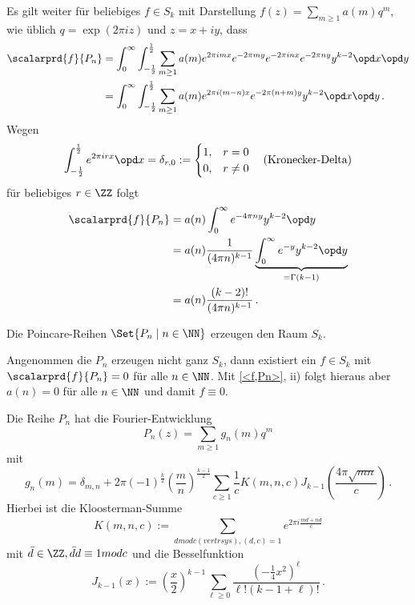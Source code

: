 \begin{bewe-list}
Es gilt weiter für beliebiges $f \in S_k$ mit Darstellung $f(z) = \sum_{m \geq 1} a(m)q^m$, wie üblich $q = \exp(2\pi iz)$ und $z = x + iy$, dass
\begin{align*}
	\scalarprd {f}{P_n} &= \int_0^\infty \int_{-\frac 12}^{\frac 12} \sum_{m \geq 1} a(m) e^{2 \pi imx}e^{-2\pi my}e^{-2\pi inx}e^{-2\pi ny}y^{k-2} \opd x \opd y\\
	&= \int_0^\infty \int_{-\frac 12}^{\frac 12} \sum_{m \geq 1} a(m) e^{2 \pi i(m-n)x}e^{-2\pi (n+m)y}y^{k-2} \opd x \opd y\,.
\end{align*}
Wegen 
\[
	\int_{- \frac 12}^{\frac 12} e^{2 \pi irx} \opd x = \delta_{r,0} := \begin{cases}1, & r = 0\\0, & r \neq 0\end{cases} \quad \text{(Kronecker-Delta)}
\]
für beliebiges $r \in \ZZ$ folgt
\begin{align*}
	\scalarprd {f}{P_n} &= a(n) \int_0^\infty e^{-4\pi ny} y^{k-2} \opd y \\
	&= a(n) \frac{1}{(4\pi n)^{k-1}} \underbrace{\int_0^\infty e^{-y} y^{k-2} \opd y}_{= \Gamma(k-1)} \\
	&= a(n) \frac{(k-2)!}{(4\pi n)^{k-1}}
	\,.
\end{align*}
\end{bewe-list}

\begin{koro}
Die Poincare-Reihen $\Set{ P_n \mid n \in \NN}$ erzeugen den Raum $S_k$.
\end{koro}

\begin{bewe}
Angenommen die $P_n$ erzeugen nicht ganz $S_k$, dann existiert ein $f \in S_k$ mit $\scalarprd {f}{P_n} = 0$ für alle $n \in \NN$. Mit \autoref{<f,Pn>}, ii) folgt hieraus aber $a(n) = 0$ für alle $n \in \NN$ und damit $f \equiv 0$.
\end{bewe}

\begin{satz}
Die Reihe $P_n$ hat die Fourier-Entwicklung
\[
	P_n(z) = \sum_{m \geq 1} g_n(m) q^m
\]
mit
\[
	g_n(m) = \delta_{m,n} + 2\pi (-1)^{\frac k2} (\frac mn)^{\frac {k-1}2} \sum_{c \geq 1} \frac 1c K(m,n,c) J_{k-1}(\frac{4\pi \sqrt{mn}}c)
	\,.
\]
Hierbei ist die Kloosterman-Summe
\[
	K(m,n,c) := \sum_{d mod c (vertrsys), (d,c)=1} e^{2\pi i \frac{md + n\bar{d}}{c}}
\]
mit $\bar d \in \ZZ, \bar d d \equiv 1 mod c$ und die Besselfunktion
\[
	J_{k-1}(x) := (\frac x2)^{k-1} \sum_{\ell \geq 0} \frac{(-\frac 14 x^2)^\ell}{\ell! (k-1+\ell)!}
	\,.
\]
\end{satz}

